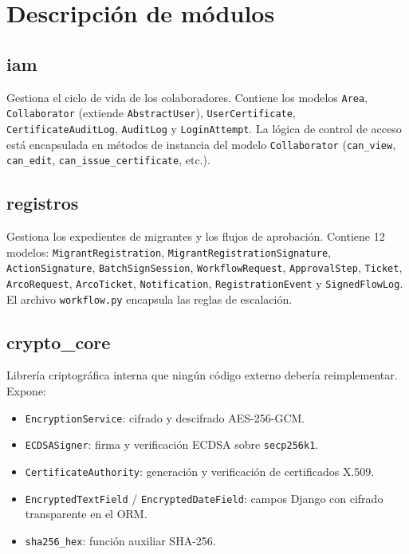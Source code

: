 \documentclass[10pt,letterpaper]{report}
\begin{document}
\section{Descripción de módulos}

\subsection{iam}
Gestiona el ciclo de vida de los colaboradores. Contiene los modelos \texttt{Area}, \texttt{Collaborator} (extiende \texttt{AbstractUser}), \texttt{UserCertificate}, \texttt{CertificateAuditLog}, \texttt{AuditLog} y \texttt{LoginAttempt}. La lógica de control de acceso está encapsulada en métodos de instancia del modelo \texttt{Collaborator} (\texttt{can\_view}, \texttt{can\_edit}, \texttt{can\_issue\_certificate}, etc.).

\subsection{registros}
Gestiona los expedientes de migrantes y los flujos de aprobación. Contiene 12 modelos: \texttt{MigrantRegistration}, \texttt{MigrantRegistrationSignature}, \texttt{ActionSignature}, \texttt{BatchSignSession}, \texttt{WorkflowRequest}, \texttt{ApprovalStep}, \texttt{Ticket}, \texttt{ArcoRequest}, \texttt{ArcoTicket}, \texttt{Notification}, \texttt{RegistrationEvent} y \texttt{SignedFlowLog}. El archivo \texttt{workflow.py} encapsula las reglas de escalación.

\subsection{crypto\_core}
Librería criptográfica interna que ningún código externo debería reimplementar. Expone:
\begin{itemize}[leftmargin=*]
    \item \texttt{EncryptionService}: cifrado y descifrado AES-256-GCM.
    \item \texttt{ECDSASigner}: firma y verificación ECDSA sobre \texttt{secp256k1}.
    \item \texttt{CertificateAuthority}: generación y verificación de certificados X.509.
    \item \texttt{EncryptedTextField} / \texttt{EncryptedDateField}: campos Django con cifrado transparente en el ORM.
    \item \texttt{sha256\_hex}: función auxiliar SHA-256.
\end{itemize}
\end{document}
